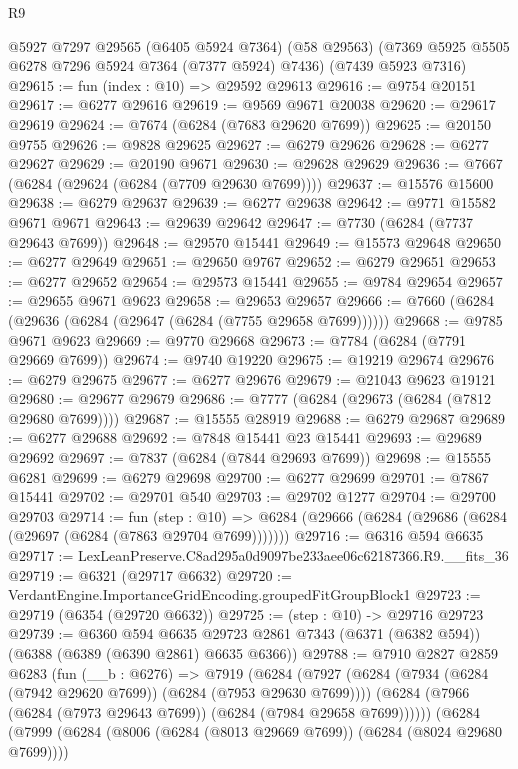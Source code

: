 \begin{lexlean}{R9}
\begin{coremodule}
    @5927
    @7297
    @29565
    (@6405 @5924 @7364)
    (@58 @29563)
    (@7369 @5925 @5505 @6278 @7296 @5924 @7364 (@7377 @5924) @7436)
    (@7439 @5923 @7316)
@29615 := fun (index : @10) => @29592 @29613
@29616 := @9754 @20151
@29617 := @6277 @29616
@29619 := @9569 @9671 @20038
@29620 := @29617 @29619
@29624 := @7674 (@6284 (@7683 @29620 @7699))
@29625 := @20150 @9755
@29626 := @9828 @29625
@29627 := @6279 @29626
@29628 := @6277 @29627
@29629 := @20190 @9671
@29630 := @29628 @29629
@29636 := @7667 (@6284 (@29624 (@6284 (@7709 @29630 @7699))))
@29637 := @15576 @15600
@29638 := @6279 @29637
@29639 := @6277 @29638
@29642 := @9771 @15582 @9671 @9671
@29643 := @29639 @29642
@29647 := @7730 (@6284 (@7737 @29643 @7699))
@29648 := @29570 @15441
@29649 := @15573 @29648
@29650 := @6277 @29649
@29651 := @29650 @9767
@29652 := @6279 @29651
@29653 := @6277 @29652
@29654 := @29573 @15441
@29655 := @9784 @29654
@29657 := @29655 @9671 @9623
@29658 := @29653 @29657
@29666 := @7660 (@6284 (@29636 (@6284 (@29647 (@6284 (@7755 @29658 @7699))))))
@29668 := @9785 @9671 @9623
@29669 := @9770 @29668
@29673 := @7784 (@6284 (@7791 @29669 @7699))
@29674 := @9740 @19220
@29675 := @19219 @29674
@29676 := @6279 @29675
@29677 := @6277 @29676
@29679 := @21043 @9623 @19121
@29680 := @29677 @29679
@29686 := @7777 (@6284 (@29673 (@6284 (@7812 @29680 @7699))))
@29687 := @15555 @28919
@29688 := @6279 @29687
@29689 := @6277 @29688
@29692 := @7848 @15441 @23 @15441
@29693 := @29689 @29692
@29697 := @7837 (@6284 (@7844 @29693 @7699))
@29698 := @15555 @6281
@29699 := @6279 @29698
@29700 := @6277 @29699
@29701 := @7867 @15441
@29702 := @29701 @540
@29703 := @29702 @1277
@29704 := @29700 @29703
@29714 := fun (step : @10) =>
  @6284 (@29666 (@6284 (@29686 (@6284 (@29697 (@6284 (@7863 @29704 @7699)))))))
@29716 := @6316 @594 @6635
@29717 := LexLeanPreserve.C8ad295a0d9097be233aee06c62187366.R9.__fits_36
@29719 := @6321 (@29717 @6632)
@29720 := VerdantEngine.ImportanceGridEncoding.groupedFitGroupBlock1
@29723 := @29719 (@6354 (@29720 @6632))
@29725 := (step : @10) -> @29716 @29723
@29739 := @6360
    @594
    @6635
    @29723
    @2861
    @7343
    (@6371 (@6382 @594))
    (@6388 (@6389 (@6390 @2861) @6635 @6366))
@29788 := @7910
    @2827
    @2859
    @6283
    (fun (__b : @6276) =>
    @7919
      (@6284
        (@7927
          (@6284 (@7934 (@6284 (@7942 @29620 @7699)) (@6284 (@7953 @29630 @7699))))
          (@6284 (@7966 (@6284 (@7973 @29643 @7699)) (@6284 (@7984 @29658 @7699))))))
      (@6284
        (@7999
          (@6284 (@8006 (@6284 (@8013 @29669 @7699)) (@6284 (@8024 @29680 @7699))))

\end{coremodule}
\end{lexlean}
